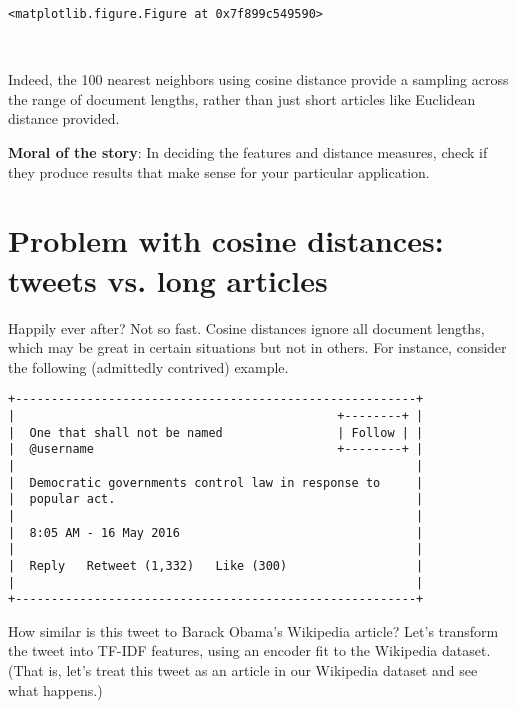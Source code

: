 \documentclass[11pt]{article}
\begin{document}
    
    \begin{verbatim}
<matplotlib.figure.Figure at 0x7f899c549590>
    \end{verbatim}

    
    \begin{center}
    \end{center}
    { \hspace*{\fill} \\}
    
    Indeed, the 100 nearest neighbors using cosine distance provide a
sampling across the range of document lengths, rather than just short
articles like Euclidean distance provided.

    \textbf{Moral of the story}: In deciding the features and distance
measures, check if they produce results that make sense for your
particular application.

    \section{Problem with cosine distances: tweets vs. long
articles}\label{problem-with-cosine-distances-tweets-vs.-long-articles}

    Happily ever after? Not so fast. Cosine distances ignore all document
lengths, which may be great in certain situations but not in others. For
instance, consider the following (admittedly contrived) example.

    \begin{verbatim}
+--------------------------------------------------------+
|                                             +--------+ |
|  One that shall not be named                | Follow | |
|  @username                                  +--------+ |
|                                                        |
|  Democratic governments control law in response to     |
|  popular act.                                          |
|                                                        |
|  8:05 AM - 16 May 2016                                 |
|                                                        |
|  Reply   Retweet (1,332)   Like (300)                  |
|                                                        |
+--------------------------------------------------------+
\end{verbatim}

    How similar is this tweet to Barack Obama's Wikipedia article? Let's
transform the tweet into TF-IDF features, using an encoder fit to the
Wikipedia dataset. (That is, let's treat this tweet as an article in our
Wikipedia dataset and see what happens.)
\end{document}
